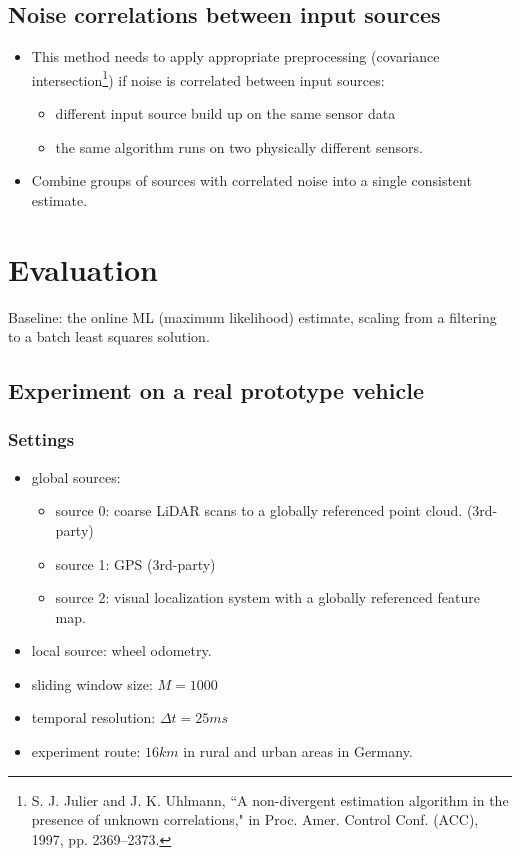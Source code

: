 \documentclass[letterpaper,11pt]{article}
\begin{document}
\subsection{Noise correlations between input sources}

\begin{itemize}
	\item This method needs to apply appropriate preprocessing (covariance intersection\footnote{S. J. Julier and J. K. Uhlmann, ``A non-divergent estimation algorithm in the presence of unknown correlations," in Proc. Amer. Control Conf. (ACC), 1997, pp. 2369–2373.}) if noise is correlated between input sources:
	\begin{itemize}
		\item different input source build up on the same sensor data
		\item the same algorithm runs on two physically different sensors.
	\end{itemize}
	\item Combine groups of sources with correlated noise into a single consistent estimate.
\end{itemize}

\section{Evaluation}

Baseline: the online ML (maximum likelihood) estimate, scaling from a filtering to a batch least squares solution.

\subsection{Experiment on a real prototype vehicle}

\subsubsection{Settings}
\begin{itemize}
	\item global sources:
	\begin{itemize}
		\item source 0: coarse LiDAR scans to a globally referenced point cloud. (3rd-party)
		\item source 1: GPS (3rd-party)
		\item source 2: visual localization system with a globally referenced feature map.
	\end{itemize}
	\item local source: wheel odometry.
	\item sliding window size: $M=1000$
	\item temporal resolution: $\Delta t=25ms$
	\item experiment route: $16km$ in rural and urban areas in Germany.
\end{itemize}
\end{document}
